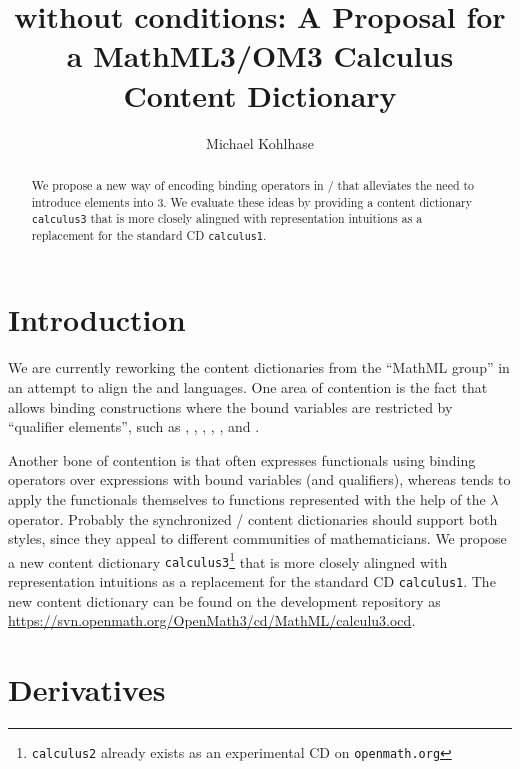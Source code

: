 \documentclass[12pt]{article}
\title{{\openmath3} without conditions: A Proposal for a MathML3/OM3 Calculus Content Dictionary}
\author{Michael Kohlhase}
\begin{document}
\maketitle
\begin{abstract}
  We propose a new way of encoding binding operators in {\openmath/\mathml} that
  alleviates the need to introduce {} elements into {\openmath}3. We
  evaluate these ideas by providing a content dictionary {\texttt{calculus3}} that is more
  closely alingned with {} representation intuitions as a replacement for the
  {\openmath} standard CD {\texttt{calculus1}}.
\end{abstract}

\section{Introduction}
We are currently reworking the {\openmath} content dictionaries from the ``MathML group''
in an attempt to align the {} and {} languages. One area of contention
is the fact that {\mathml} allows binding constructions where the bound variables are
restricted by ``qualifier elements'', such as {},
{}, {}, {}, {}, and
{}.

Another bone of contention is that {\mathml} often expresses functionals using binding
operators over expressions with bound variables (and qualifiers), whereas {\openmath}
tends to apply the functionals themselves to functions represented with the help of the
$\lambda$ operator. Probably the synchronized {}/{} content dictionaries
should support both styles, since they appeal to different communities of
mathematicians. We propose a new content dictionary
{\texttt{calculus3}}\footnote{{\texttt{calculus2}} already exists as an experimental CD on
  {\texttt{openmath.org}}} that is more closely alingned with {} representation
intuitions as a replacement for the {\openmath} standard CD {\texttt{calculus1}}. The new
content dictionary can be found on the {} development repository as
{\url{https://svn.openmath.org/OpenMath3/cd/MathML/calculu3.ocd}}.

\section{Derivatives}
\end{document}
